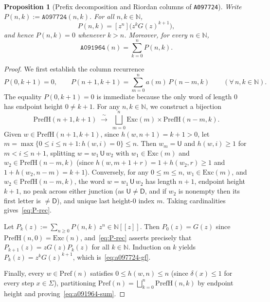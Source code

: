 \documentclass[11pt]{article}
\newcommand{\llbracket}{[\![}
\newcommand{\rrbracket}{]\!]}
\newtheorem{proposition}[theorem]{Proposition}
\theoremstyle{definition}
\newcommand{\N}{\mathbb{N}}
\newcommand{\seq}[1]{\texttt{#1}}
\newcommand{\StepU}{\mathsf{U}}
\newcommand{\StepD}{\mathsf{D}}
\newcommand{\Exc}{\mathrm{Exc}}
\newcommand{\Pref}{\mathrm{Pref}}
\newcommand{\PrefH}{\mathrm{PrefH}}
\begin{document}
\begin{proposition}[Prefix decomposition and Riordan columns of \seq{A097724}]
\label{prop:a097724-gf}
Write $P(n, k) := \seq{A097724}(n, k)$. For all $n, k \in \N$,
\begin{equation}
\label{eq:a097724-gf}
P(n, k) = [z^n]\bigl(z^k G(z)^{k+1}\bigr),
\end{equation}
and hence $P(n, k) = 0$ whenever $k > n$. Moreover, for every $n \in \N$,
\begin{equation}
\label{eq:a091964-sum}
\seq{A091964}(n) = \sum_{k=0}^{n} P(n, k).
\end{equation}
\end{proposition}

\begin{proof}
We first establish the column recurrence
\begin{equation}
\label{eq:P-rec}
P(0, k + 1) = 0, \qquad P(n + 1, k + 1) = \sum_{m=0}^{n} a(m)\,P(n - m, k) \qquad (\forall\, n, k \in \N).
\end{equation}
The equality $P(0, k + 1) = 0$ is immediate because the only word of length $0$ has endpoint height $0 \ne k + 1$. For any $n, k \in \N$, we construct a bijection
\[
\PrefH(n + 1, k + 1) \;\xrightarrow{\;\sim\;}\; \bigsqcup_{m=0}^{n} \Exc(m) \times \PrefH(n - m, k).
\]
Given $w \in \PrefH(n + 1, k + 1)$, since $h(w, n+1) = k + 1 > 0$, let $m = \max\{0 \le i \le n+1 : h(w, i) = 0\} \le n$. Then $w_m = \StepU$ and $h(w, i) \ge 1$ for $m < i \le n + 1$, splitting $w = w_1\,\StepU\,w_2$ with $w_1 \in \Exc(m)$ and $w_2 \in \PrefH(n - m, k)$ (since $h(w, m+1+r) = 1 + h(w_2, r) \ge 1$ and $1 + h(w_2, n-m) = k+1$). Conversely, for any $0 \le m \le n$, $w_1 \in \Exc(m)$, and $w_2 \in \PrefH(n - m, k)$, the word $w = w_1\,\StepU\,w_2$ has length $n + 1$, endpoint height $k + 1$, no peak across either junction (as $\StepU \ne \StepD$, and if $w_2$ is nonempty then its first letter is $\ne \StepD$), and unique last height-$0$ index $m$. Taking cardinalities gives~\eqref{eq:P-rec}.

Let $P_k(z) := \sum_{n \ge 0} P(n, k)\,z^n \in \N\llbracket z \rrbracket$. Then $P_0(z) = G(z)$ since $\PrefH(n, 0) = \Exc(n)$, and~\eqref{eq:P-rec} asserts precisely that $P_{k+1}(z) = z G(z) P_k(z)$ for all $k \in \N$. Induction on $k$ yields $P_k(z) = z^k G(z)^{k+1}$, which is~\eqref{eq:a097724-gf}.

Finally, every $w \in \Pref(n)$ satisfies $0 \le h(w, n) \le n$ (since $\delta(x) \le 1$ for every step $x \in \Sigma$), partitioning $\Pref(n) = \bigsqcup_{k=0}^n \PrefH(n, k)$ by endpoint height and proving~\eqref{eq:a091964-sum}.
\end{proof}
\end{document}
